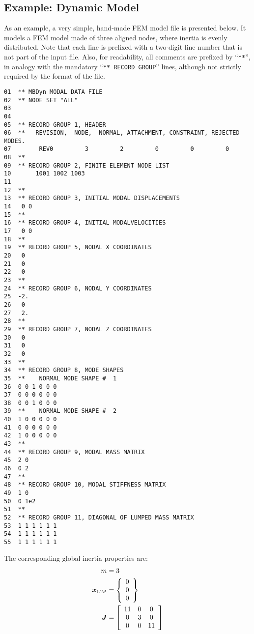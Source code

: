 \subsection{Example: Dynamic Model}
\label{sec:APP:EL:STRUCT:JOINT:MODAL:DYNAMIC-MODEL}
As an example, a very simple, hand-made FEM model file is presented below.
It models a FEM model made of three aligned nodes, where inertia 
is evenly distributed.
Note that each line is prefixed with a two-digit line number 
that is not part of the input file.
Also, for readability, all comments are prefixed by ``\texttt{**}'', in analogy
with the mandatory ``\texttt{** RECORD GROUP}'' lines, although not strictly
required by the format of the file.

{\small
\begin{verbatim}
01  ** MBDyn MODAL DATA FILE
02  ** NODE SET "ALL" 
03    
04    
05  ** RECORD GROUP 1, HEADER
06  **   REVISION,  NODE,  NORMAL, ATTACHMENT, CONSTRAINT, REJECTED MODES.
07        REV0         3         2         0         0         0
08  **
09  ** RECORD GROUP 2, FINITE ELEMENT NODE LIST
10       1001 1002 1003
11  
12  **
13  ** RECORD GROUP 3, INITIAL MODAL DISPLACEMENTS
14   0 0
15  **
16  ** RECORD GROUP 4, INITIAL MODALVELOCITIES
17   0 0
18  **
19  ** RECORD GROUP 5, NODAL X COORDINATES
20   0
21   0
22   0
23  **
24  ** RECORD GROUP 6, NODAL Y COORDINATES
25  -2.
26   0
27   2.
28  **
29  ** RECORD GROUP 7, NODAL Z COORDINATES
30   0
31   0
32   0
33  **
34  ** RECORD GROUP 8, MODE SHAPES
35  **    NORMAL MODE SHAPE #  1
36  0 0 1 0 0 0
37  0 0 0 0 0 0
38  0 0 1 0 0 0
39  **    NORMAL MODE SHAPE #  2
40  1 0 0 0 0 0
41  0 0 0 0 0 0
42  1 0 0 0 0 0
43  **
44  ** RECORD GROUP 9, MODAL MASS MATRIX
45  2 0
46  0 2
47  **
48  ** RECORD GROUP 10, MODAL STIFFNESS MATRIX
49  1 0
50  0 1e2
51  **
52  ** RECORD GROUP 11, DIAGONAL OF LUMPED MASS MATRIX
53  1 1 1 1 1 1
54  1 1 1 1 1 1
55  1 1 1 1 1 1
\end{verbatim}
}

The corresponding global inertia properties are:
\begin{align}
	m		&= 3 \\
	\T{x}_{CM}	&= \cubr{\cvvect{
		0 \\
		0 \\
		0
	}} \\
	\T{J}		&= \sqbr{\matr{ccc}{
		11 &  0 &  0 \\
		 0 &  3 &  0 \\
		 0 &  0 & 11
	}}
\end{align}


